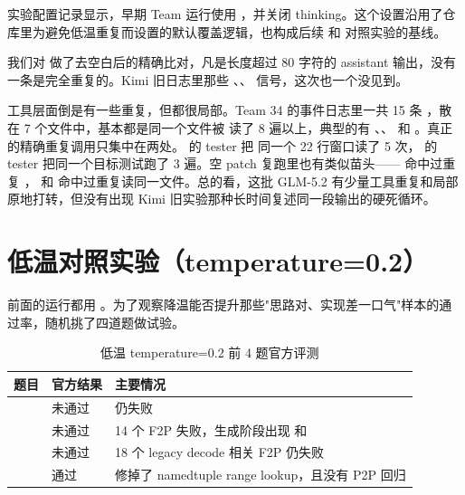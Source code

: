 \documentclass[UTF8,a4paper,11pt]{ctexart}
\begin{document}
实验配置记录显示，早期 Team 运行使用 ，并关闭 thinking。这个设置沿用了仓库里为避免低温重复而设置的默认覆盖逻辑，也构成后续  和  对照实验的基线。

我们对  做了去空白后的精确比对，凡是长度超过 80 字符的 assistant 输出，没有一条是完全重复的。Kimi 旧日志里那些 、、 信号，这次也一个没见到。

工具层面倒是有一些重复，但都很局部。Team 34 的事件日志里一共 15 条 ，散在 7 个文件中，基本都是同一个文件被  读了 8 遍以上，典型的有 、、 和 。真正的精确重复调用只集中在两处。 的 tester 把  同一个 22 行窗口读了 5 次， 的 tester 把同一个目标测试跑了 3 遍。空 patch 复跑里也有类似苗头—— 命中过重复 ， 和  命中过重复读同一文件。总的看，这批 GLM-5.2 有少量工具重复和局部原地打转，但没有出现 Kimi 旧实验那种长时间复述同一段输出的硬死循环。

\section{低温对照实验（temperature=0.2）}

前面的运行都用 。为了观察降温能否提升那些"思路对、实现差一口气"样本的通过率，随机挑了四道题做试验。

\begin{table}[H]
\centering
\begin{tabular}{L{4.6cm} C{1.8cm} L{6.4cm}}
\toprule
题目 & 官方结果 & 主要情况 \\
\midrule
{} & 未通过 & 仍失败  \\
 & 未通过 & 14 个 F2P 失败，生成阶段出现  和  \\
 & 未通过 & 18 个 legacy decode 相关 F2P 仍失败 \\
 & 通过 & 修掉了 namedtuple range lookup，且没有 P2P 回归 \\
\bottomrule
\end{tabular}
\caption{低温 temperature=0.2 前 4 题官方评测}
\end{table}
\end{document}
